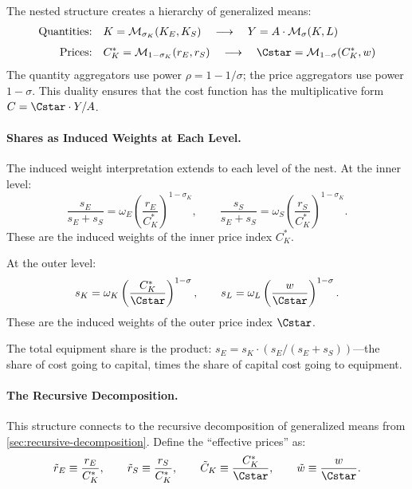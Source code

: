 \begin{calloutimportant}
The nested structure creates a hierarchy of generalized means:
\begin{align*}
\text{Quantities:} \quad & K = \M_{\sigma_K}(K_E, K_S) \quad \longrightarrow \quad Y = A \cdot \M_\sigma(K, L) \\[4pt]
\text{Prices:} \quad & C_K^* = \M_{1-\sigma_K}(r_E, r_S) \quad \longrightarrow \quad \Cstar = \M_{1-\sigma}(C_K^*, w)
\end{align*}
The quantity aggregators use power $\rho = 1 - 1/\sigma$; the price aggregators use power $1 - \sigma$. This duality ensures that the cost function has the multiplicative form $C = \Cstar \cdot Y/A$.
\end{calloutimportant}

\paragraph{Shares as Induced Weights at Each Level.}
The induced weight interpretation extends to each level of the nest. At the inner level:
\begin{equation}
\frac{s_E}{s_E + s_S} = \omega_E \left( \frac{r_E}{C_K^*} \right)^{1-\sigma_K}, \qquad \frac{s_S}{s_E + s_S} = \omega_S \left( \frac{r_S}{C_K^*} \right)^{1-\sigma_K}.
\label{eq:inner-shares}
\end{equation}
These are the induced weights of the inner price index $C_K^*$.

At the outer level:
\begin{equation}
s_K = \omega_K \left( \frac{C_K^*}{\Cstar} \right)^{1-\sigma}, \qquad s_L = \omega_L \left( \frac{w}{\Cstar} \right)^{1-\sigma}.
\label{eq:outer-shares}
\end{equation}
These are the induced weights of the outer price index $\Cstar$.

The total equipment share is the product: $s_E = s_K \cdot (s_E/(s_E + s_S))$---the share of cost going to capital, times the share of capital cost going to equipment.

\paragraph{The Recursive Decomposition.}
This structure connects to the recursive decomposition of generalized means from \cref{sec:recursive-decomposition}. Define the ``effective prices'' as:
\begin{equation}
\tilde{r}_E \equiv \frac{r_E}{C_K^*}, \qquad \tilde{r}_S \equiv \frac{r_S}{C_K^*}, \qquad \tilde{C}_K \equiv \frac{C_K^*}{\Cstar}, \qquad \tilde{w} \equiv \frac{w}{\Cstar}.
\label{eq:effective-prices}
\end{equation}

